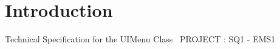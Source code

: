 \hypertarget{index_intro_sec}{}\section{Introduction}\label{index_intro_sec}
Technical Specification for the U\+I\+Menu Class~\newline
 P\+R\+O\+J\+E\+C\+T \+: S\+Q1 -\/ E\+M\+S1~\newline
 